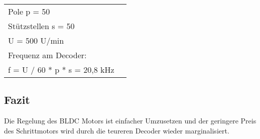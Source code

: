 \par\bigskip
\begin{tabularx}{\textwidth} {@{\hspace{1cm}}lX@{}}
	Pole p = 50 \\
	Stützstellen s = 50 \\
    U = 500 U/min \\
    Frequenz am Decoder: \\
    f = U / 60 * p * s = 20,8 kHz \\
\end{tabularx}

\subsection{Fazit}
Die Regelung des BLDC Motors ist einfacher Umzusetzen und der geringere Preis des Schrittmotors wird durch die teureren Decoder wieder marginalisiert.


\newpage
